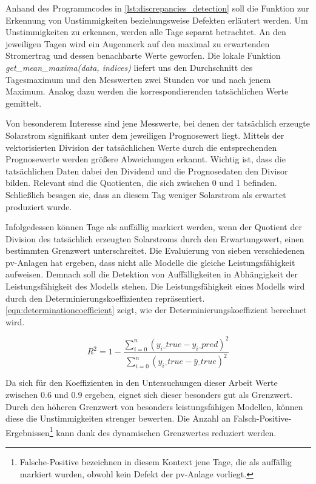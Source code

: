 \documentclass[12pt, a4paper]{article}
\begin{document}
Anhand des Programmcodes in  \autoref{lst:discrepancies_detection} soll die Funktion zur Erkennung von Unstimmigkeiten beziehungsweise Defekten erläutert werden. Um Unstimmigkeiten zu erkennen, werden alle Tage separat betrachtet. An den jeweiligen Tagen wird ein Augenmerk auf den maximal zu erwartenden Stromertrag und dessen benachbarte Werte geworfen. Die lokale Funktion \textit{get\_mean\_maxima(data, indices)} liefert uns den Durchschnitt des Tagesmaximum und den Messwerten zwei Stunden vor und nach jenem Maximum. Analog dazu werden die korrespondierenden tatsächlichen Werte gemittelt.

Von besonderem Interesse sind jene Messwerte, bei denen der tatsächlich erzeugte Solarstrom signifikant unter dem jeweiligen Prognosewert liegt. Mittels der vektorisierten Division der tatsächlichen Werte durch die entsprechenden Prognosewerte werden größere Abweichungen erkannt. Wichtig ist, dass die tatsächlichen Daten dabei den Dividend und die Prognosedaten den Divisor bilden. Relevant sind die Quotienten, die sich zwischen 0 und 1 befinden. Schließlich besagen sie, dass an diesem Tag weniger Solarstrom als erwartet produziert wurde.

Infolgedessen können Tage als auffällig markiert werden, wenn der Quotient der Division des tatsächlich erzeugten Solarstroms durch den Erwartungswert, einen bestimmten Grenzwert unterschreitet. Die Evaluierung von sieben verschiedenen \ac{pv}-Anlagen hat ergeben, dass nicht alle Modelle die gleiche Leistungsfähigkeit aufweisen. Demnach soll die Detektion von Auffälligkeiten in Abhängigkeit der Leistungsfähigkeit des Modells stehen. Die Leistungsfähigkeit eines Modells wird durch den Determinierungskoeffizienten repräsentiert. \autoref{eqn:determinationcoefficient} zeigt, wie der Determinierungskoeffizient berechnet wird.

\begin{equation}
\label{eqn:determinationcoefficient}
R^2=1-\frac{\sum_{i=0}^n(y_i\_true-y_i\_pred)^2}{\sum_{i=0}^n(y_i\_true-\bar{y}\_true)^2}
\end{equation}


Da sich für den Koeffizienten in den Untersuchungen dieser Arbeit Werte zwischen 0.6 und 0.9 ergeben, eignet sich dieser besonders gut als Grenzwert. Durch den höheren Grenzwert von besonders leistungsfähigen Modellen, können diese die Unstimmigkeiten strenger bewerten. Die Anzahl an Falsch-Positive-Ergebnissen\footnote{Falsche-Positive bezeichnen in diesem Kontext jene Tage, die als auffällig markiert wurden, obwohl kein Defekt der \ac{pv}-Anlage vorliegt.} kann dank des dynamischen Grenzwertes reduziert werden.
\end{document}
